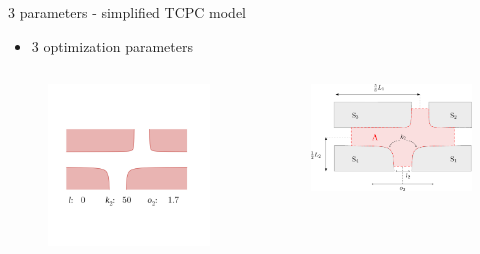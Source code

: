 \documentclass[aspectratio=169,xcolor=dvipsnames]{beamer}
\begin{document}
\begin{frame}{3 parameters - simplified TCPC model}
	\begin{itemize}
		\item 3 optimization parameters
	\end{itemize}
	\begin{columns}
		\begin{column}{.58\textwidth}
			\begin{figure}
				\includegraphics[width=1.\linewidth, trim={5cm 6cm 8cm 19cm}, clip]{Images/c.png}		
			\end{figure}
		\end{column}
		\begin{column}{.42\textwidth}
			\vspace{-15mm}
			\begin{figure}
				\includegraphics[width=1.\linewidth, trim={0 0 0 0}, clip]{Images/krizovatka.pdf}		

\end{figure}
\end{column}
\end{columns}
\end{frame}
\end{document}
